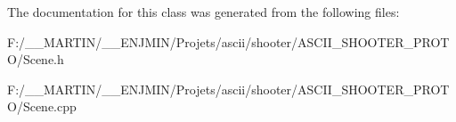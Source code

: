The documentation for this class was generated from the following files\+:\begin{DoxyCompactItemize}
\item 
F\+:/\+\_\+\+\_\+\+M\+A\+R\+T\+I\+N/\+\_\+\+\_\+\+E\+N\+J\+M\+I\+N/\+Projets/ascii/shooter/\+A\+S\+C\+I\+I\+\_\+\+S\+H\+O\+O\+T\+E\+R\+\_\+\+P\+R\+O\+T\+O/Scene.\+h\item 
F\+:/\+\_\+\+\_\+\+M\+A\+R\+T\+I\+N/\+\_\+\+\_\+\+E\+N\+J\+M\+I\+N/\+Projets/ascii/shooter/\+A\+S\+C\+I\+I\+\_\+\+S\+H\+O\+O\+T\+E\+R\+\_\+\+P\+R\+O\+T\+O/Scene.\+cpp\end{DoxyCompactItemize}
